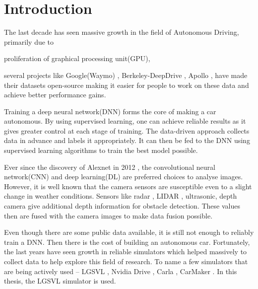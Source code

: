 \chapter{Introduction}

The last decade has seen massive growth in the field of Autonomous
Driving, primarily due to 
\begin{enumerate*}[label= \alph*)]
    \item proliferation of graphical processing unit(GPU),

    \item several projects like Google(Waymo) \cite{Waymo},
        Berkeley-DeepDrive \cite{Berkeley-DeepDrive},
        Apollo \cite{Apollo}, have made their datasets open-source making it
        easier for people to work on these data and achieve better performance gains. 
\end{enumerate*}



Training a deep neural network(DNN) forms the core of making a car autonomous. 
By using supervised learning, one can achieve reliable results as it gives greater control
at each stage of training. The data-driven approach collects data in advance and labels it
appropriately. It can then be fed to the DNN using supervised
learning algorithms to train the best model possible. 

Ever since the discovery of Alexnet in 2012 \cite{Alexnet2012}, the convolutional neural network(CNN) and
deep learning(DL) are preferred choices to analyse images.  However, it is well known that the camera sensors are susceptible even to a slight change in weather conditions. 
Sensors like radar \cite{Radar}, LIDAR \cite{LIDAR}, ultrasonic\cite{ultrasonic}, depth camera
give additional depth information for obstacle detection. These values then are fused with the camera images to make
data fusion possible. 

Even though there are some public data available, it is still not enough to reliably
train a DNN. Then there is  the cost of building an autonomous car. Fortunately, the last
years have seen growth in reliable simulators which
helped massively to collect data to help explore this field of research.
To name a few simulators that are being actively used -- LGSVL \cite{LGSVL}, Nvidia Drive
\cite{NvidiaSimulator}, Carla \cite{CarlaSimulator}, CarMaker \cite{CarMaker}. 
In this thesis, the LGSVL simulator is used.

